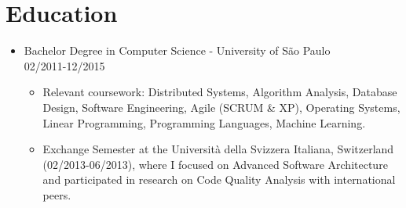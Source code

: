 
\section{Education}
\begin{itemize}
    \item \footnotesize{Bachelor Degree in Computer Science - University of São Paulo}\\
    \scriptsize{02/2011-12/2015}
    \begin{itemize}
        \item \scriptsize{Relevant coursework: Distributed Systems, Algorithm Analysis, Database Design,
            Software Engineering, Agile (SCRUM \& XP), Operating Systems, Linear Programming, Programming Languages,
            Machine Learning.}
        \item \scriptsize{Exchange Semester at the Università della Svizzera Italiana, Switzerland
            (02/2013-06/2013), where I focused on Advanced Software Architecture and participated in research on
            Code Quality Analysis with international peers.}
    \end{itemize}
\end{itemize}